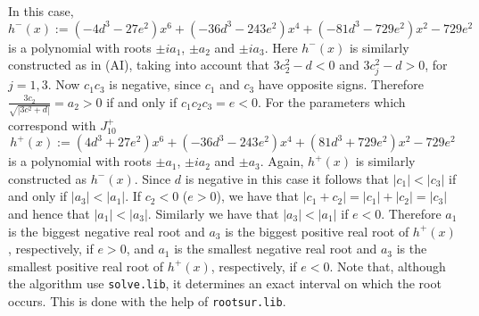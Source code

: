 \documentclass[noend]{amsproc}
\theoremstyle{definition}
\begin{document}
In this case,  
\[h^-(x):=(-4d^3-27e^2)x^6+(-36d^3-243e^2)x^4+(-81d^3-729e^2)x^2-729e^2\]
is a polynomial with roots $\pm i a_1$, $\pm a_2$ and $\pm i a_3$. Here $h^{-}(x)$ is similarly constructed as in (AI), taking into account that $3c_2^2-d<0$ and $3c_j^2-d>0$, for $j=1,3$. Now $c_1c_3$ is negative, since $c_1$ and $c_3$ have opposite signs. Therefore $\frac{3c_2}{\sqrt{|3c^2+d|}}=a_2>0$ if and only if $c_1c_2c_3=e<0$. For the parameters which correspond with $J_{10}^+$
 \[h^+(x):=(4d^3+27e^2)x^6+(-36d^3-243e^2)x^4+(81d^3+729e^2)x^2-729e^2\]
is a polynomial with roots $\pm a_1$, $\pm i a_2$ and $\pm a_3$. Again, $h^+(x)$ is similarly constructed as $h^-(x)$.
Since $d$ is negative in this case it follows that $|c_1|<|c_3|$ if and only if $|a_3|<|a_1|$. If $c_2<0$ ($e>0$), we have that $|c_1+c_2|=|c_1|+|c_2|=|c_3|$ and hence that $|a_1|<|a_3|$. Similarly we have that $|a_3|<|a_1|$ if $e<0$. Therefore $a_1$ is the biggest negative real root and $a_3$ is the biggest positive real root of $h^+(x)$, respectively, if $e>0$, and $a_1$ is the smallest negative real root and $a_3$ is the smallest positive real root of $h^+(x)$, respectively, if $e<0$.  Note that, although the algorithm use {\tt solve.lib}, it determines an exact interval on which the root occurs. This is done with the help of {\tt rootsur.lib}.
\end{document}
